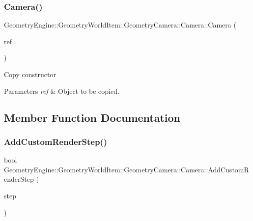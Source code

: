 \subsubsection{\texorpdfstring{Camera()}{Camera()}\hspace{0.1cm}{\footnotesize\ttfamily [2/2]}}
{\footnotesize\ttfamily Geometry\+Engine\+::\+Geometry\+World\+Item\+::\+Geometry\+Camera\+::\+Camera\+::\+Camera (\begin{DoxyParamCaption}\item[{const \mbox{\hyperlink{class_geometry_engine_1_1_geometry_world_item_1_1_geometry_camera_1_1_camera}{Camera}} \&}]{ref }\end{DoxyParamCaption})}

Copy constructor 
\begin{DoxyParams}{Parameters}
{\em ref} & Object to be copied. \\
\hline
\end{DoxyParams}


\subsection{Member Function Documentation}
\mbox{\label{class_geometry_engine_1_1_geometry_world_item_1_1_geometry_camera_1_1_camera_a548c5c566cc732b7d0c00aca94cdcbbe}} 
\subsubsection{\texorpdfstring{AddCustomRenderStep()}{AddCustomRenderStep()}}
{\footnotesize\ttfamily bool Geometry\+Engine\+::\+Geometry\+World\+Item\+::\+Geometry\+Camera\+::\+Camera\+::\+Add\+Custom\+Render\+Step (\begin{DoxyParamCaption}\item[{const \mbox{\hyperlink{class_geometry_engine_1_1_geometry_render_step_1_1_render_step}{Geometry\+Render\+Step\+::\+Render\+Step}} \&}]{step }\end{DoxyParamCaption})\hspace{0.3cm}{\ttfamily [virtual]}}

